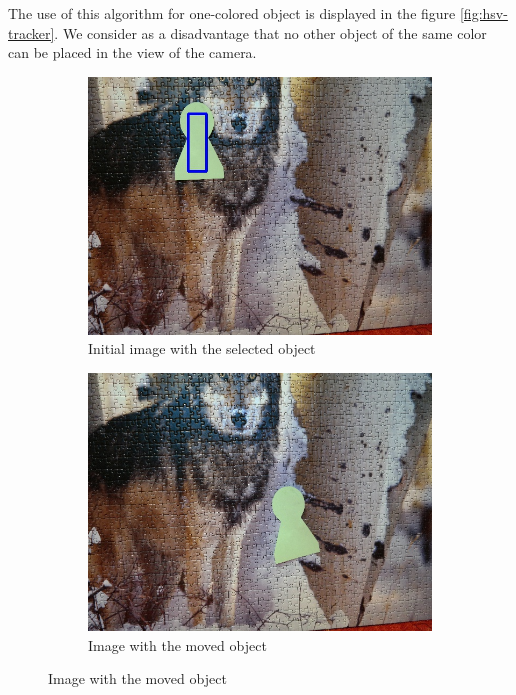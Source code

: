 The use of this algorithm for one-colored object is displayed in the figure
\ref{fig:hsv-tracker}. We consider as a disadvantage that no other object of
the same color can be placed in the view of the camera.

\begin{figure}
  \centering
  \begin{subfigure}[b]{0.48\linewidth}
    \includegraphics[width=\linewidth]{img/hsv/initial.jpg}
    \caption{Initial image with the selected object}
  \end{subfigure}
  \begin{subfigure}[b]{0.48\linewidth}
    \includegraphics[width=\linewidth]{img/hsv/object.jpg}
    \caption{Image with the moved object}

\end{subfigure}
\end{figure}
